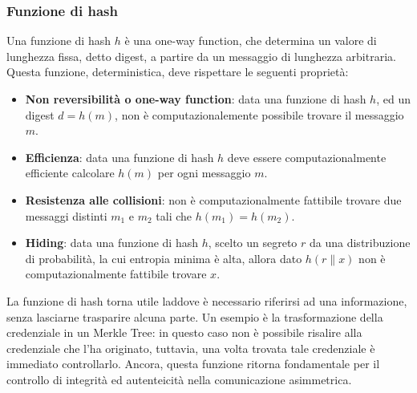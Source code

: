 \documentclass[a4paper,12pt]{article}
\begin{document}
\subsubsection{Funzione di hash}
Una funzione di hash $h$ è una one-way function, che determina un valore di lunghezza fissa, detto digest, a partire da un messaggio di lunghezza arbitraria. Questa funzione, deterministica, deve rispettare le seguenti proprietà:
\begin{itemize}
    \item \textbf{Non reversibilità o one-way function}: data una funzione di hash $h$, ed un digest $d=h(m)$, non è computazionalemente possibile trovare il messaggio $m$.
    \item \textbf{Efficienza}: data una funzione di hash $h$ deve essere computazionalmente efficiente calcolare $h(m)$ per ogni messaggio $m$.
    \item \textbf{Resistenza alle collisioni}: non è computazionalmente fattibile trovare due messaggi distinti $m_1$ e $m_2$ tali che $h(m_1)=h(m_2)$.
    \item \textbf{Hiding}: data una funzione di hash $h$, scelto un segreto $r$ da una distribuzione di probabilità, la cui entropia minima è alta, allora dato $h(r\|x)$ non è computazionalmente fattibile trovare $x$.
\end{itemize}
La funzione di hash torna utile laddove è necessario riferirsi ad una informazione, senza lasciarne trasparire alcuna parte. Un esempio è la trasformazione della credenziale in un Merkle Tree: in questo caso non è possibile risalire alla credenziale che l'ha originato, tuttavia, una volta trovata tale credenziale è immediato controllarlo.
\newline Ancora, questa funzione ritorna fondamentale per il controllo di integrità ed autenteicità nella comunicazione asimmetrica.

\end{document}
